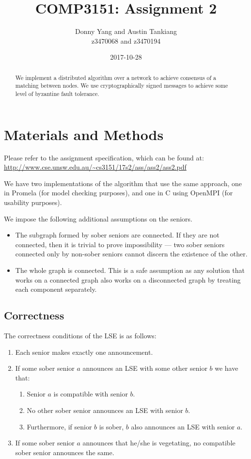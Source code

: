 \documentclass[a4paper]{scrartcl}
\begin{document}
\title{COMP3151: Assignment 2}
\author{Donny Yang and Austin Tankiang \\ z3470068 and z3470194}
\date{2017-10-28}
\maketitle

\begin{abstract}
    We implement a distributed algorithm over a network to achieve consensus of a matching between nodes. We use cryptographically signed messages to achieve some level of byzantine fault tolerance.
\end{abstract}

\section{Materials and Methods}
Please refer to the assignment specification, which can be found at: \url{http://www.cse.unsw.edu.au/~cs3151/17s2/ass/ass2/ass2.pdf}

We have two implementations of the algorithm that use the same approach, one in Promela (for model checking purposes), and one in C using OpenMPI (for usability purposes).

We impose the following additional assumptions on the seniors.
\begin{itemize}
    \item The subgraph formed by sober seniors are connected. If they are not connected, then it is trivial to prove impossibility --- two sober seniors connected only by non-sober seniors cannot discern the existence of the other.
    \item The whole graph is connected. This is a safe assumption as any solution that works on a connected graph also works on a disconnected graph by treating each component separately.
\end{itemize}

\subsection{Correctness}
The correctness conditions of the LSE is as follows:

\begin{enumerate}
\item Each senior makes exactly one announcement.
\item If some sober senior \(a\) announces an LSE with some other senior \(b\) we have that:
    \begin{enumerate}
    \item Senior \(a\) is compatible with senior \(b\).
    \item No other sober senior announces an LSE with senior \(b\).
    \item Furthermore, if senior \(b\) is sober, \(b\) also announces an LSE with senior \(a\).
    \end{enumerate}
\item If some sober senior \(a\) announces that he/she is vegetating, no compatible sober senior announces the same.
\end{enumerate}
\end{document}
